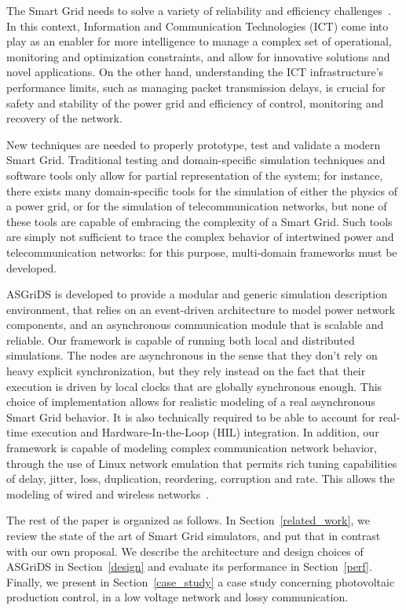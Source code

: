 \documentclass[conference]{IEEEtran}
\begin{document}
The Smart Grid needs to solve a variety of reliability and efficiency challenges~\cite{moslehiReliabilityPerspectiveSmart2010}. In this context, Information and Communication Technologies (ICT) come into play as an enabler for more intelligence to manage a complex set of operational, monitoring and optimization constraints, and allow for innovative solutions and novel applications.
On the other hand, understanding the ICT infrastructure's performance limits, such as managing packet transmission delays, is crucial for safety and stability of the power grid and efficiency of control, monitoring and recovery of the network.

New techniques are needed to properly prototype, test and validate a modern Smart Grid. Traditional testing and domain-specific simulation techniques and software tools only allow for partial representation of the system; for instance, there exists many domain-specific tools for the simulation of either the physics of a power grid, or for the simulation of telecommunication networks, but none of these tools are capable of embracing the complexity of a Smart Grid. Such tools are simply not sufficient to trace the complex behavior of intertwined power and telecommunication networks: for this purpose, multi-domain frameworks must be developed.

ASGriDS is developed to provide a modular and generic simulation description environment, that relies on an event-driven architecture to model power network components, and an asynchronous communication module that is scalable and reliable. Our framework is capable of running both local and distributed simulations. The nodes are asynchronous in the sense that they don't rely on heavy explicit synchronization, but they rely instead on the fact that their execution is driven by local clocks that are globally synchronous enough. This choice of implementation allows for realistic modeling of a real asynchronous Smart Grid behavior. It is also technically required to be able to account for real-time execution and Hardware-In-the-Loop (HIL) integration.
In addition, our framework is capable of modeling complex communication network behavior, through the use of Linux network emulation that permits rich tuning capabilities of delay, jitter, loss, duplication, reordering, corruption and rate. This allows the modeling of wired and wireless networks~\cite{hemminger2005network}.

The rest of the paper is organized as follows. In Section~\ref{related_work}, we review the state of the art of Smart Grid simulators, and put that in contrast with our own proposal. We describe the architecture and design choices of ASGriDS in Section~\ref{design} and evaluate its performance in Section~\ref{perf}. Finally, we present in Section~\ref{case_study} a case study concerning photovoltaic production control, in a low voltage network and lossy communication.
\end{document}
